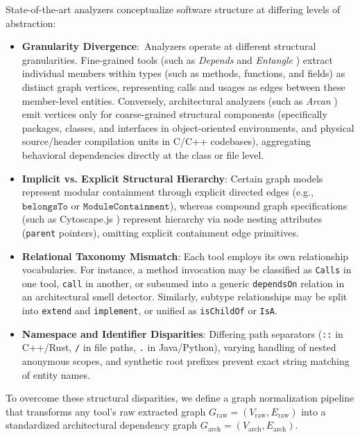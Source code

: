State-of-the-art analyzers conceptualize software structure at
differing levels of abstraction:
\begin{itemize}
  \item \textbf{Granularity Divergence}:\ Analyzers operate at different
    structural granularities. Fine-grained tools (such as \textit{Depends}
    \cite{depends_github} and \textit{Entangle} \cite{teruzzi_2024})
    extract individual members within types (such as methods, functions,
    and fields) as distinct graph vertices, representing calls and usages
    as edges between these member-level entities. Conversely, architectural
    analyzers (such as \textit{Arcan} \cite{fontana_arcan_2017}) emit
    vertices only for coarse-grained structural components (specifically
      packages, classes, and interfaces in object-oriented environments,
    and physical source/header compilation units in C/C++ codebases),
    aggregating behavioral dependencies directly at the class or file level.
  \item \textbf{Implicit vs. Explicit Structural Hierarchy}: Certain
    graph models represent modular containment through explicit
    directed edges (e.g., $\texttt{belongsTo}$ or
    $\texttt{ModuleContainment}$), whereas compound graph
    specifications (such as Cytoscape.js
    \cite{franz_cytoscapejs_2016}) represent hierarchy
    via node nesting attributes (\texttt{parent} pointers), omitting
    explicit containment edge primitives.
  \item \textbf{Relational Taxonomy Mismatch}: Each tool employs
    its own relationship vocabularies. For instance, a method
    invocation may be classified as \texttt{Calls} in one tool,
    \texttt{call} in another, or subsumed into a generic
    \texttt{dependsOn} relation in an architectural smell detector.
    Similarly, subtype relationships may be split into
    \texttt{extend} and \texttt{implement}, or unified as
    \texttt{isChildOf} or \texttt{IsA}.
  \item \textbf{Namespace and Identifier Disparities}: Differing path
    separators (\texttt{::} in C++/Rust, \texttt{/} in file paths,
    \texttt{.} in Java/Python), varying handling of nested anonymous
    scopes, and synthetic root prefixes prevent exact string matching
    of entity names.
\end{itemize}

To overcome these structural disparities, we define a graph
normalization pipeline that transforms any tool's raw extracted graph
$G_{\text{raw}} = (V_{\text{raw}}, E_{\text{raw}})$ into a
standardized architectural dependency graph $G_{\text{arch}} =
(V_{\text{arch}}, E_{\text{arch}})$.

